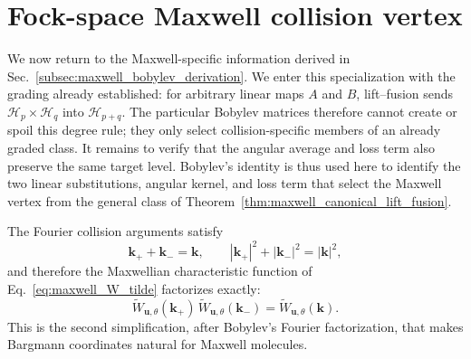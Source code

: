 \documentclass[11pt,oneside]{article}
\numberwithin{equation}{section}
\theoremstyle{definition}
\begin{document}
\section{Fock-space Maxwell collision vertex}
\label{subsec:maxwell_bobylev}


We now return to the Maxwell-specific information derived in Sec.~\ref{subsec:maxwell_bobylev_derivation}.  We enter this specialization with the grading already established: for arbitrary linear maps $A$ and $B$, lift--fusion sends $\mathscr H_p\times\mathscr H_q$ into $\mathscr H_{p+q}$.  The particular Bobylev matrices therefore cannot create or spoil this degree rule; they only select collision-specific members of an already graded class.  It remains to verify that the angular average and loss term also preserve the same target level.  Bobylev's identity is thus used here to identify the two linear substitutions, angular kernel, and loss term that select the Maxwell vertex from the general class of Theorem~\ref{thm:maxwell_canonical_lift_fusion}.

The Fourier collision arguments satisfy
\begin{equation}
\bm k_++\bm k_-=\bm k,
\qquad
|\bm k_+|^2+|\bm k_-|^2=|\bm k|^2,
\label{eq:maxwell_k_invariants}
\end{equation}
and therefore the Maxwellian characteristic function of Eq.~\eqref{eq:maxwell_W_tilde} factorizes exactly:
\begin{equation}
\widetilde W_{\bm u,\theta}(\bm k_+)\,
\widetilde W_{\bm u,\theta}(\bm k_-)
=
\widetilde W_{\bm u,\theta}(\bm k).
\label{eq:maxwell_W_tilde_factorization}
\end{equation}
This is the second simplification, after Bobylev's Fourier factorization, that makes Bargmann coordinates natural for Maxwell molecules.
\end{document}
